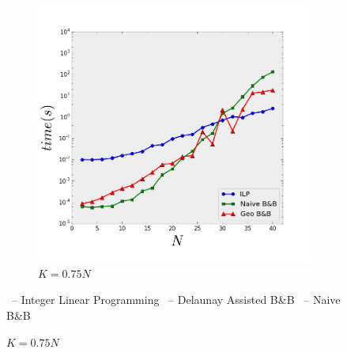 \begin{figure}[t]
	\begin{center}
	\begin{subfigure}[b]{0.3\linewidth}
		\includegraphics[width=0.9\linewidth]{Pictures/k3} 
		\caption{$K=0.75N$} 
		\label{fig:fixed_k:c} 
	\end{subfigure}
	\end{center}
	\vspace{-0.5cm}
	\begin{center}
	\footnotesize
    \textcolor{blue}{\cmark}\ -- Integer Linear Programming \textcolor{red}{\tmark}\ -- Delaunay Assisted B\&B \textcolor{green}{\smark}\ -- Naive B\&B
    \end{center}
\end{figure}

